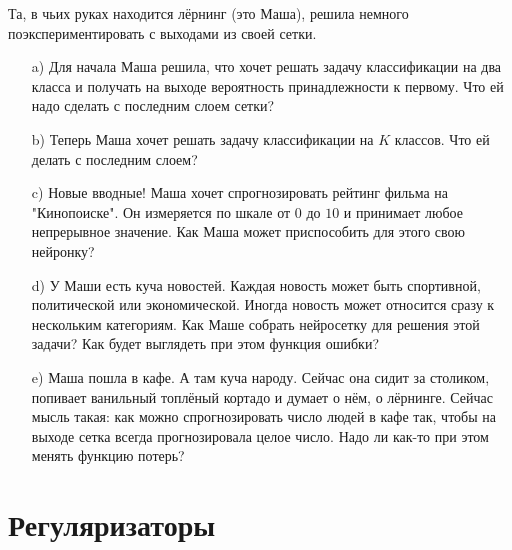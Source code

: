 \documentclass[12pt, a4paper, oneside]{article}
\theoremstyle{plain} %
\theoremstyle{definition}
\begin{document}


\begin{problem}
Та, в чьих руках находится лёрнинг (это Маша), решила немного поэкспериментировать с выходами из своей сетки. 
\begin{itemize}
	\item[a)]  Для начала Маша решила, что хочет решать задачу классификации на два класса и получать на выходе вероятность принадлежности к первому. Что ей надо сделать с последним слоем сетки? 
	\item[b)]  Теперь Маша хочет решать задачу классификации на $K$ классов. Что ей делать с последним слоем? 
	\item[c)]  Новые вводные! Маша хочет спрогнозировать рейтинг фильма на "Кинопоиске". Он измеряется по шкале от $0$ до $10$ и принимает любое непрерывное значение. Как Маша может приспособить для этого свою нейронку? 
	\item[d)]  У Маши есть куча новостей. Каждая новость может быть спортивной, политической или экономической. Иногда новость может относится сразу к нескольким категориям. Как Маше собрать нейросетку для решения этой задачи?  Как будет выглядеть при этом функция ошибки? 
	\item[e)]  Маша пошла в кафе. А там куча народу. Сейчас она сидит за столиком, попивает ванильный топлёный кортадо и думает о нём, о лёрнинге.  Сейчас мысль такая: как можно спрогнозировать число людей в кафе так, чтобы на выходе сетка всегда прогнозировала целое число. Надо ли как-то при этом менять функцию потерь? 
\end{itemize}
\end{problem}




\section{Регуляризаторы}


	
\end{document}
